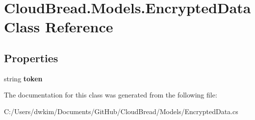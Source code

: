 \hypertarget{a00074}{}\section{Cloud\+Bread.\+Models.\+Encrypted\+Data Class Reference}
\label{a00074}
\subsection*{Properties}
\begin{DoxyCompactItemize}
\item 
string {\bfseries token}\hypertarget{a00074_a6aebf9b968ebbdb57cfac4e0178ebf41}{}\label{a00074_a6aebf9b968ebbdb57cfac4e0178ebf41}

\end{DoxyCompactItemize}


The documentation for this class was generated from the following file\+:\begin{DoxyCompactItemize}
\item 
C\+:/\+Users/dwkim/\+Documents/\+Git\+Hub/\+Cloud\+Bread/\+Models/Encrypted\+Data.\+cs\end{DoxyCompactItemize}
